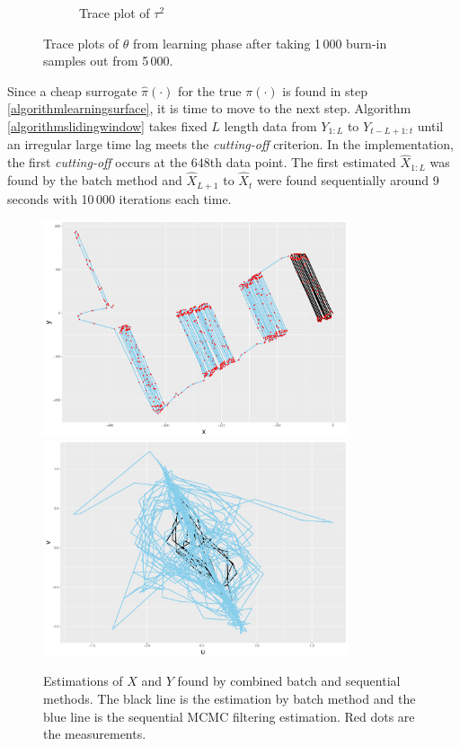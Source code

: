 \begin{figure}[h]
\begin{subfigure}[t]{0.45\textwidth}
	\caption{Trace plot of $\tau^2$}
\end{subfigure}
\caption{Trace plots of $\theta$ from learning phase after taking 1\,000 burn-in samples out from 5\,000. }
\end{figure}


Since a cheap surrogate $\hat{\pi}(\cdot)$ for the true $\pi(\cdot)$ is found in step \ref{algorithmlearningsurface}, it is time to move to the next step. Algorithm \ref{algorithmslidingwindow} takes fixed $L$ length data from $Y_{1:L}$ to $Y_{t-L+1:t}$ until an irregular large time lag meets the \textit{cutting-off} criterion. In the implementation, the first \textit{cutting-off} occurs at the $648$th data point. The first estimated $\hat{X}_{1:L}$ was found by the batch method and $\hat{X}_{L+1}$ to $\hat{X}_{t}$ were found sequentially around 9 seconds with 10\,000 iterations each time. 

\begin{figure}[h]
\centering
\includegraphics[width=0.8\textwidth]{Chapters/05MCMCOU/plots/realdatabatchPosition2.pdf}
\includegraphics[width=0.8\textwidth]{Chapters/05MCMCOU/plots/realdatabatchVelocity2.pdf}
\caption{Estimations of $X$ and $Y$ found by combined batch and sequential methods. The black line is the estimation by batch method and the blue line is the sequential MCMC filtering estimation. Red dots are the measurements.}
\end{figure}



